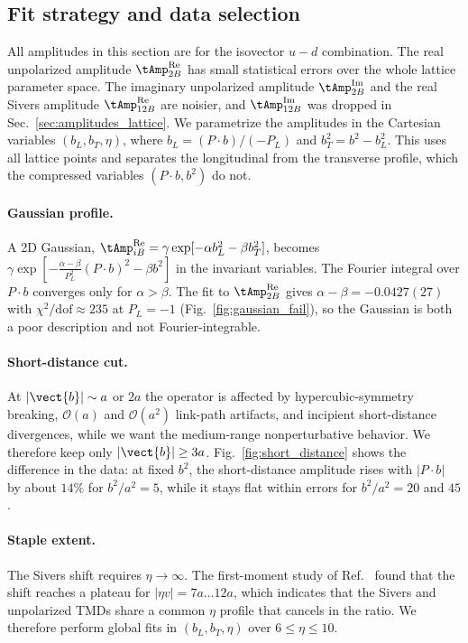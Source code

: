 \subsection{Fit strategy and data selection}
\label{sec:fit_strategy}

All amplitudes in this section are for the isovector $u-d$ combination. The real unpolarized amplitude $\tAmp_{2B}^{\text{Re}}$ has small statistical errors over the whole lattice parameter space. The imaginary unpolarized amplitude $\tAmp_{2B}^{\text{Im}}$ and the real Sivers amplitude $\tAmp_{12B}^{\text{Re}}$ are noisier, and $\tAmp_{12B}^{\text{Im}}$ was dropped in Sec.~\ref{sec:amplitudes_lattice}. We parametrize the amplitudes in the Cartesian variables $(b_L,b_T,\eta)$, where $b_L=(P\cdot b)/(-P_L)$ and $b_T^2=b^2-b_L^2$. This uses all lattice points and separates the longitudinal from the transverse profile, which the compressed variables $(P\cdot b,b^2)$ do not.

\paragraph{Gaussian profile.}
A 2D Gaussian, $\tAmp^{\text{Re}}_{iB}=\gamma\exp[-\alpha b_L^2-\beta b_T^2]$, becomes $\gamma\exp[-\tfrac{\alpha-\beta}{P_L^2}(P\cdot b)^2-\beta b^2]$ in the invariant variables. The Fourier integral over $P\cdot b$ converges only for $\alpha>\beta$. The fit to $\tAmp^{\text{Re}}_{2B}$ gives $\alpha-\beta=-0.0427(27)$ with $\chi^2/\text{dof}\approx 235$ at $P_L=-1$ (Fig.~\ref{fig:gaussian_fail}), so the Gaussian is both a poor description and not Fourier-integrable.

\paragraph{Short-distance cut.}
At $|\vect{b}|\sim a$ or $2a$ the operator is affected by hypercubic-symmetry breaking, $\mathcal O(a)$ and $\mathcal O(a^2)$ link-path artifacts, and incipient short-distance divergences, while we want the medium-range nonperturbative behavior. We therefore keep only $|\vect{b}|\ge 3a$. Fig.~\ref{fig:short_distance} shows the difference in the data: at fixed $b^2$, the short-distance amplitude rises with $|P\cdot b|$ by about $14\%$ for $b^2/a^2=5$, while it stays flat within errors for $b^2/a^2=20$ and $45$.

\paragraph{Staple extent.}
The Sivers shift requires $\eta\to\infty$. The first-moment study of Ref.~\cite{Musch:2011er} found that the shift reaches a plateau for $|\eta v|=7a\ldots12a$, which indicates that the Sivers and unpolarized TMDs share a common $\eta$ profile that cancels in the ratio. We therefore perform global fits in $(b_L,b_T,\eta)$ over $6\le\eta\le10$.


